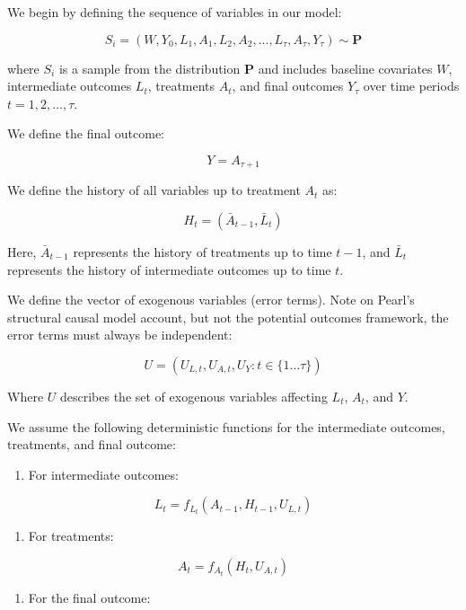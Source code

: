 \documentclass[
  single column]{article}
\providecommand{\tightlist}{%
  \setlength{\itemsep}{0pt}\setlength{\parskip}{0pt}}\usepackage{longtable,booktabs,array}
\begin{document}
We begin by defining the sequence of variables in our model:

\[
S_i= (W, Y_0, L_1, A_1, L_2, A_2, ..., L_\tau, A_\tau, Y_{\tau}) \sim \mathbf{P}
\]

where \(S_i\) is a sample from the distribution \(\mathbf{P}\) and
includes baseline covariates \(W\), intermediate outcomes \(L_t\),
treatments \(A_t\), and final outcomes \(Y_{\tau}\) over time periods
\(t = 1, 2, \ldots, \tau\).

We define the final outcome:

\[
Y = A_{\tau + 1}
\]

We define the history of all variables up to treatment \(A_t\) as:

\[
H_t = (\bar{A}_{t-1}, \bar{L}_t)
\]

Here, \(\bar{A}_{t-1}\) represents the history of treatments up to time
\(t-1\), and \(\bar{L}_t\) represents the history of intermediate
outcomes up to time \(t\).

We define the vector of exogenous variables (error terms). Note on
Pearl's structural causal model account, but not the potential outcomes
framework, the error terms must always be independent:

\[
U = (U_{L,t}, U_{A,t}, U_{Y}: t \in \{1 \dots \tau\})
\]

Where \(U\) describes the set of exogenous variables affecting \(L_t\),
\(A_t\), and \(Y\).

We assume the following deterministic functions for the intermediate
outcomes, treatments, and final outcome:

\begin{enumerate}
\def\labelenumi{\arabic{enumi}.}
\tightlist
\item
  For intermediate outcomes:
\end{enumerate}

\[
L_t = f_{L_t}(A_{t-1}, H_{t-1}, U_{L,t})
\]

\begin{enumerate}
\def\labelenumi{\arabic{enumi}.}
\setcounter{enumi}{1}
\tightlist
\item
  For treatments:
\end{enumerate}

\[
A_t = f_{A_t}(H_t, U_{A,t})
\]

\begin{enumerate}
\def\labelenumi{\arabic{enumi}.}
\setcounter{enumi}{2}
\tightlist
\item
  For the final outcome:
\end{enumerate}
\end{document}
